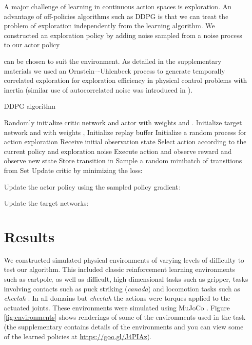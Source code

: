 \documentclass{article} \usepackage{iclr2016_conference,times}
\begin{document}
A major challenge of learning in continuous action spaces is exploration.
An advantage of off-policies algorithms such
as DDPG is that we can treat the problem of exploration independently
from the learning algorithm. We constructed an exploration policy
 by adding noise
sampled from a noise process  to our actor policy

 can be chosen to suit the environment.  As
detailed in the supplementary materials we used an Ornstein–-Uhlenbeck
process \citep{uhlenbeck1930theory} to generate temporally correlated
exploration for exploration efficiency in physical control problems
with inertia (similar use of autocorrelated noise was introduced in
\citep{wawrzynski2015control}).


\begin{algorithm}[h]
  \caption{DDPG algorithm \label{algo:ddpg}}
  \label{dpgalgo}
  \begin{algorithmic}
    \STATE Randomly initialize critic network  and actor
     with weights  and .
    \STATE Initialize target network  and  with weights , 
    \STATE Initialize replay buffer 
      \STATE Initialize a random process  for action
      exploration
      \STATE Receive initial observation state 
        \STATE Select action 
        according to the current policy and exploration noise
        \STATE Execute action  and observe
        reward  and observe new state 
        \STATE Store transition  in 
        \STATE Sample a random minibatch of  transitions
                from 
        \STATE Set 
\STATE Update critic by minimizing the loss:
               
        \STATE Update the actor policy using the sampled policy gradient:
        
        \STATE Update the target networks:
          
          
        \ENDFOR
    \ENDFOR
  \end{algorithmic}
\end{algorithm}



\section{Results}

We constructed simulated physical environments of varying levels of
difficulty to test our algorithm. This included classic reinforcement
learning environments such as cartpole, as well as difficult, high
dimensional tasks such as gripper, tasks involving contacts such as
puck striking (\emph{canada}) and locomotion tasks such as
\emph{cheetah} \citep{wawrzynski2009real}.  In all domains but
\emph{cheetah} the actions were torques applied to the actuated joints.
These environments were simulated using
MuJoCo \citep{todorov2012mujoco}.
Figure \ref{fig:environments} shows renderings of
some of the environments used in the task (the supplementary contains
details of the environments and you can view some of the learned policies at
\url{https://goo.gl/J4PIAz}).
\end{document}
